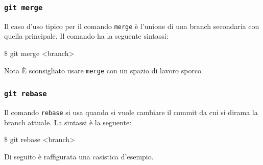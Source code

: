 \documentclass{beamer}
\begin{document}
\begin{frame}
  \frametitle{\texttt{git merge}}
  Il caso d'uso tipico per il comando \texttt{merge} \`e l'unione di una branch
  secondaria con quella principale. Il comando ha la seguente sintassi:
  \begin{semiverbatim}
  \$ git merge <branch>
  \end{semiverbatim}

  \begin{figure}
  \end{figure}

  \pause
  \begin{block}{Nota}
    \`E sconsigliato usare \texttt{merge} con un spazio di lavoro sporco
  \end{block}
\end{frame}

\begin{frame}
  \frametitle{\texttt{git rebase}}
  Il comando \texttt{rebase} si usa quando si vuole cambiare il commit da cui si
  dirama la branch attuale. La sintassi \`e la seguente:
  \begin{semiverbatim}
  \$ git rebase <branch>
  \end{semiverbatim}
  Di seguito \`e raffigurata una casistica d'esempio.

  \begin{figure}
  \end{figure}
\end{frame}
\end{document}
